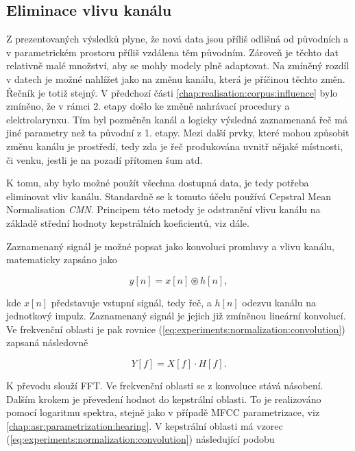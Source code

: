 
\subsection{Eliminace vlivu kanálu}
\label{chap:realisation:corpus:elimination}

Z prezentovaných výsledků plyne, že nová data jsou příliš odlišná od původních a v parametrickém prostoru příliš vzdálena těm původním. Zároveň je těchto dat relativně malé množství, aby se mohly modely plně adaptovat. Na zmíněný rozdíl v datech je možné nahlížet jako na změnu kanálu, která je příčinou těchto změn. Řečník je totiž stejný. V předchozí části \ref{chap:realisation:corpus:influence} bylo zmíněno, že v rámci 2. etapy došlo ke změně nahrávací procedury a elektrolarynxu. Tím byl pozměněn kanál a logicky výsledná zaznamenaná řeč má jiné parametry než ta původní z 1. etapy. Mezi další prvky, které mohou způsobit změnu kanálu je prostředí, tedy zda je řeč produkována uvnitř nějaké místnosti, či venku, jestli je na pozadí přítomen šum atd.

K tomu, aby bylo možné použít všechna dostupná data, je tedy potřeba eliminovat vliv kanálu. Standardně se k tomuto účelu používá Cepstral Mean Normalisation \textit{CMN}. Principem této metody je odstranění vlivu kanálu na základě střední hodnoty kepstrálních koeficientů, viz dále.

Zaznamenaný signál je možné popsat jako konvoluci promluvy a vlivu kanálu, matematicky zapsáno jako

\begin{equation}
  y\left[n\right] = x\left[n\right] \circledast h\left[n\right],
  \label{eq:experiments:normalization:convolution}
\end{equation}

\noindent kde $x\left[n\right]$ představuje vstupní signál, tedy řeč, a $h\left[n\right]$ odezvu kanálu na jednotkový impulz. Zaznamenaný signál je jejich již zmíněnou lineární konvolucí. Ve frekvenční oblasti je pak rovnice (\ref{eq:experiments:normalization:convolution}) zapsaná následovně

\begin{equation}
  Y\left[f\right] = X\left[f\right] \cdot H\left[f\right].
\end{equation}

\noindent K převodu slouží FFT. Ve frekvenční oblasti se z konvoluce stává násobení. Dalším krokem je převedení hodnot do kepstrální oblasti. To je realizováno pomocí logaritmu spektra, stejně jako v případě MFCC parametrizace, viz \ref{chap:asr:parametrization:hearing}. V kepstrální oblasti má vzorec (\ref{eq:experiments:normalization:convolution}) následující podobu

